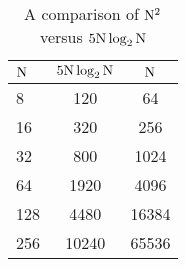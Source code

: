 \documentclass[11pt]{article}
\begin{document}
\begin{enumerate}
\begin{table}
\label{tab:nlogn}
\caption{A comparison of $\mathrm{N}^2$ versus $5\mathrm{N}\log_2\mathrm{N}$}
\centering
\begin{tabular}{l| c c }
    $\mathrm{N}$ & $5 \mathrm{N}\log_2\mathrm{N}$ & $\mathrm{N}$ \\
    \hline
    8 & 120 & 64 \\
    16 & 320 & 256\\
    32 & 800 & 1024\\
    64 & 1920 & 4096\\
    128 & 4480 & 16384\\
    256 & 10240 & 65536\\
\hline
\end{tabular}
\end{table}


\end{enumerate}
    
\end{document}
